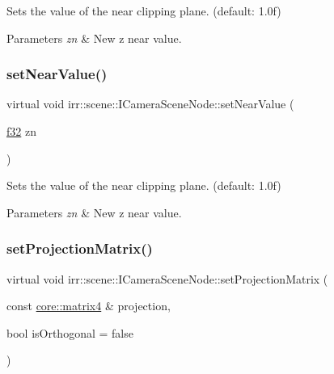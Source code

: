 Sets the value of the near clipping plane. (default\+: 1.\+0f) 


\begin{DoxyParams}{Parameters}
{\em zn} & New z near value. \\
\hline
\end{DoxyParams}
\mbox{\label{classirr_1_1scene_1_1ICameraSceneNode_aab5107ae5d0373d6fb005a87741e7057}} 
\subsubsection{\texorpdfstring{set\+Near\+Value()}{setNearValue()}\hspace{0.1cm}{\footnotesize\ttfamily [2/2]}}
{\footnotesize\ttfamily virtual void irr\+::scene\+::\+I\+Camera\+Scene\+Node\+::set\+Near\+Value (\begin{DoxyParamCaption}\item[{\hyperlink{namespaceirr_a0277be98d67dc26ff93b1a6a1d086b07}{f32}}]{zn }\end{DoxyParamCaption})\hspace{0.3cm}{\ttfamily [pure virtual]}}



Sets the value of the near clipping plane. (default\+: 1.\+0f) 


\begin{DoxyParams}{Parameters}
{\em zn} & New z near value. \\
\hline
\end{DoxyParams}
\mbox{\label{classirr_1_1scene_1_1ICameraSceneNode_a022415e06070ad77c6053eba64ba62ae}} 
\subsubsection{\texorpdfstring{set\+Projection\+Matrix()}{setProjectionMatrix()}\hspace{0.1cm}{\footnotesize\ttfamily [1/2]}}
{\footnotesize\ttfamily virtual void irr\+::scene\+::\+I\+Camera\+Scene\+Node\+::set\+Projection\+Matrix (\begin{DoxyParamCaption}\item[{const \hyperlink{namespaceirr_1_1core_a4c9d4e29899535971052810954a14431}{core\+::matrix4} \&}]{projection,  }\item[{bool}]{is\+Orthogonal = {\ttfamily false} }\end{DoxyParamCaption})\hspace{0.3cm}{\ttfamily [pure virtual]}}



